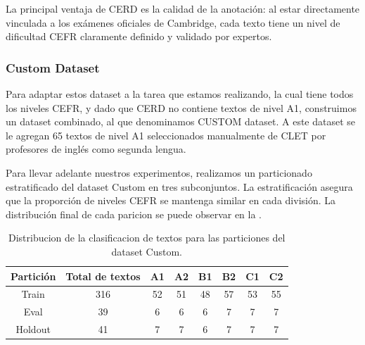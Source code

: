 \begin{table}[H]
\centering
{}
\caption{Distribucion de la clasificacion de textos para CERD.}
\label{tab:CERD}
\end{table}

La principal ventaja de CERD es la calidad de la anotación: al estar directamente vinculada a los exámenes oficiales de Cambridge, cada texto tiene un nivel de dificultad CEFR claramente definido y validado por expertos.

\subsubsection{Custom Dataset}
Para adaptar estos dataset a la tarea que estamos realizando, la cual tiene todos los niveles CEFR, y dado que CERD no contiene textos de nivel A1, construimos un dataset combinado, al que denominamos CUSTOM dataset. A este dataset se le agregan 65 textos de nivel A1 seleccionados manualmente de CLET por profesores de inglés como segunda lengua.

Para llevar adelante nuestros experimentos, realizamos un particionado estratificado del dataset Custom en tres subconjuntos. La estratificación asegura que la proporción de niveles CEFR se mantenga similar en cada división. La distribución final de cada paricion se puede observar en la .

\begin{table}[H]
\centering
\begin{tabular}{@{}cccccccc@{}}
\toprule
\textbf{Partición} & \textbf{Total de textos} & \textbf{A1} & \textbf{A2} & \textbf{B1} & \textbf{B2} & \textbf{C1} & \textbf{C2} \\ \midrule
Train          & 316 & 52 & 51 & 48 & 57 & 53 & 55 \\
Eval           & 39  & 6  & 6  & 6  & 7  & 7  & 7  \\
Holdout        & 41  & 7  & 7  & 6  & 7  & 7  & 7  \\ \bottomrule
\end{tabular}%
\caption{Distribucion de la clasificacion de textos para las particiones del dataset Custom.}
\label{tab:Custom}
\end{table}


